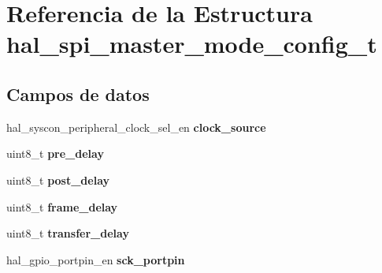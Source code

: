 \hypertarget{structhal__spi__master__mode__config__t}{}\section{Referencia de la Estructura hal\+\_\+spi\+\_\+master\+\_\+mode\+\_\+config\+\_\+t}
\label{structhal__spi__master__mode__config__t}
\subsection*{Campos de datos}
\begin{DoxyCompactItemize}
\item 
\mbox{\label{structhal__spi__master__mode__config__t_a4fc55a90db87cc859597fc736d158b9f}} 
hal\+\_\+syscon\+\_\+peripheral\+\_\+clock\+\_\+sel\+\_\+en {\bfseries clock\+\_\+source}
\item 
\mbox{\label{structhal__spi__master__mode__config__t_aec7c815b4d7ce53450de2f56fed9b77f}} 
uint8\+\_\+t {\bfseries pre\+\_\+delay}
\item 
\mbox{\label{structhal__spi__master__mode__config__t_a159df2e75061017f3b5c2b0367a43989}} 
uint8\+\_\+t {\bfseries post\+\_\+delay}
\item 
\mbox{\label{structhal__spi__master__mode__config__t_a0748a3120ed57c454b3cf71bd24ed287}} 
uint8\+\_\+t {\bfseries frame\+\_\+delay}
\item 
\mbox{\label{structhal__spi__master__mode__config__t_a251892b4bc0035fa156f7fb2003e4715}} 
uint8\+\_\+t {\bfseries transfer\+\_\+delay}
\item 
\mbox{\label{structhal__spi__master__mode__config__t_a42a0f8ba9d8f636fd0fbcd4f28cc92d9}} 
hal\+\_\+gpio\+\_\+portpin\+\_\+en {\bfseries sck\+\_\+portpin}
\item 
\mbox{\label{structhal__spi__master__mode__config__t_a8851ce5bd49f91f8316b945f321a5c5e}} 

\end{DoxyCompactItemize}
